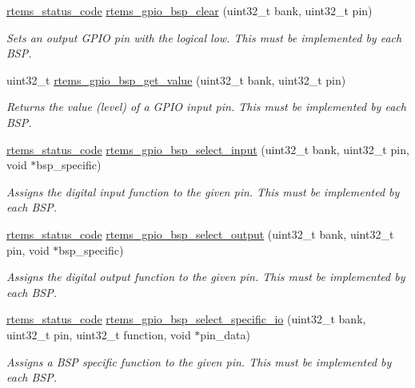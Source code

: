 \begin{DoxyCompactItemize}
\mbox{\hyperlink{group__ClassicStatus_ga545d41846817eaba6143d52ee4d9e9fe}{rtems\+\_\+status\+\_\+code}} \mbox{\hyperlink{rpi-gpio_8c_a592adea1ce8d2b73d8d0b02a6d4e0115}{rtems\+\_\+gpio\+\_\+bsp\+\_\+clear}} (uint32\+\_\+t bank, uint32\+\_\+t pin)
\begin{DoxyCompactList}\small\item\em Sets an output G\+P\+IO pin with the logical low. This must be implemented by each B\+SP. \end{DoxyCompactList}\item 
uint32\+\_\+t \mbox{\hyperlink{rpi-gpio_8c_a70dfe1594f46a5cacefdc2827b2a0c4a}{rtems\+\_\+gpio\+\_\+bsp\+\_\+get\+\_\+value}} (uint32\+\_\+t bank, uint32\+\_\+t pin)
\begin{DoxyCompactList}\small\item\em Returns the value (level) of a G\+P\+IO input pin. This must be implemented by each B\+SP. \end{DoxyCompactList}\item 
\mbox{\hyperlink{group__ClassicStatus_ga545d41846817eaba6143d52ee4d9e9fe}{rtems\+\_\+status\+\_\+code}} \mbox{\hyperlink{rpi-gpio_8c_a26775851150867b6ef5cd262cb6a5c9b}{rtems\+\_\+gpio\+\_\+bsp\+\_\+select\+\_\+input}} (uint32\+\_\+t bank, uint32\+\_\+t pin, void $\ast$bsp\+\_\+specific)
\begin{DoxyCompactList}\small\item\em Assigns the digital input function to the given pin. This must be implemented by each B\+SP. \end{DoxyCompactList}\item 
\mbox{\hyperlink{group__ClassicStatus_ga545d41846817eaba6143d52ee4d9e9fe}{rtems\+\_\+status\+\_\+code}} \mbox{\hyperlink{rpi-gpio_8c_a98e85a6f967075ccafb25834bc23d1d5}{rtems\+\_\+gpio\+\_\+bsp\+\_\+select\+\_\+output}} (uint32\+\_\+t bank, uint32\+\_\+t pin, void $\ast$bsp\+\_\+specific)
\begin{DoxyCompactList}\small\item\em Assigns the digital output function to the given pin. This must be implemented by each B\+SP. \end{DoxyCompactList}\item 
\mbox{\hyperlink{group__ClassicStatus_ga545d41846817eaba6143d52ee4d9e9fe}{rtems\+\_\+status\+\_\+code}} \mbox{\hyperlink{rpi-gpio_8c_a1fd3a252f28ba7786d85bb2e87dd41cd}{rtems\+\_\+gpio\+\_\+bsp\+\_\+select\+\_\+specific\+\_\+io}} (uint32\+\_\+t bank, uint32\+\_\+t pin, uint32\+\_\+t function, void $\ast$pin\+\_\+data)
\begin{DoxyCompactList}\small\item\em Assigns a B\+SP specific function to the given pin. This must be implemented by each B\+SP. \end{DoxyCompactList}\item 

\end{DoxyCompactItemize}
